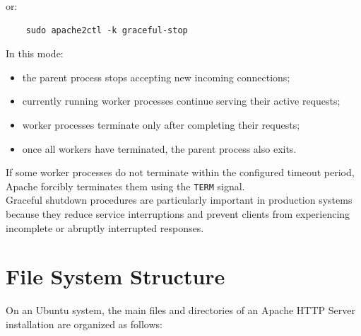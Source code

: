 \documentclass{scrbook}
\begin{document}
	or:
	
	\begin{lstlisting}
	sudo apache2ctl -k graceful-stop
	\end{lstlisting}
	
	In this mode:
	\begin{itemize}
		\item the parent process stops accepting new incoming connections;
		
		\item currently running worker processes continue serving their active requests;
		
		\item worker processes terminate only after completing their requests;
		
		\item once all workers have terminated, the parent process also exits.
	\end{itemize}
	
	If some worker processes do not terminate within the configured timeout period, Apache forcibly terminates them using the \texttt{TERM} signal.\\
	
	Graceful shutdown procedures are particularly important in production systems because they reduce service interruptions and prevent clients from experiencing incomplete or abruptly interrupted responses.	
	
	\section{File System Structure}
	
	On an Ubuntu system, the main files and directories of an Apache HTTP Server installation are organized as follows:
	
\end{document}

